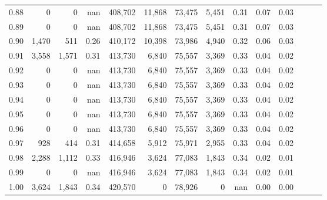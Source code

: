 \begin{tabular}{rrrrrrrrrrrrrr}
0.88 &       0 &      0 &   nan &  408,702 &   11,868 &  73,475 &   5,451 &  0.31 &  0.07 &      0.03 \\
0.89 &       0 &      0 &   nan &  408,702 &   11,868 &  73,475 &   5,451 &  0.31 &  0.07 &      0.03 \\
0.90 &   1,470 &    511 &  0.26 &  410,172 &   10,398 &  73,986 &   4,940 &  0.32 &  0.06 &      0.03 \\
0.91 &   3,558 &  1,571 &  0.31 &  413,730 &    6,840 &  75,557 &   3,369 &  0.33 &  0.04 &      0.02 \\
0.92 &       0 &      0 &   nan &  413,730 &    6,840 &  75,557 &   3,369 &  0.33 &  0.04 &      0.02 \\
0.93 &       0 &      0 &   nan &  413,730 &    6,840 &  75,557 &   3,369 &  0.33 &  0.04 &      0.02 \\
0.94 &       0 &      0 &   nan &  413,730 &    6,840 &  75,557 &   3,369 &  0.33 &  0.04 &      0.02 \\
0.95 &       0 &      0 &   nan &  413,730 &    6,840 &  75,557 &   3,369 &  0.33 &  0.04 &      0.02 \\
0.96 &       0 &      0 &   nan &  413,730 &    6,840 &  75,557 &   3,369 &  0.33 &  0.04 &      0.02 \\
0.97 &     928 &    414 &  0.31 &  414,658 &    5,912 &  75,971 &   2,955 &  0.33 &  0.04 &      0.02 \\
0.98 &   2,288 &  1,112 &  0.33 &  416,946 &    3,624 &  77,083 &   1,843 &  0.34 &  0.02 &      0.01 \\
0.99 &       0 &      0 &   nan &  416,946 &    3,624 &  77,083 &   1,843 &  0.34 &  0.02 &      0.01 \\
1.00 &   3,624 &  1,843 &  0.34 &  420,570 &        0 &  78,926 &       0 &   nan &  0.00 &      0.00 \\
\bottomrule
\end{tabular}
